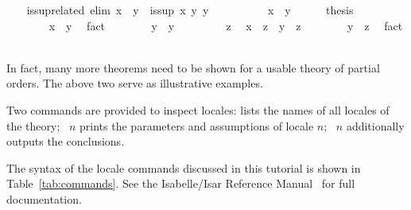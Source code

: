 \begin{isabellebody}
%
\endisatagproof
{\isafoldproof}%
%
\isadelimproof
\isanewline
%
\endisadelimproof
%
\isadeliminvisible
\isanewline
\ \ %
\endisadeliminvisible
%
\isataginvisible
{}\isamarkupfalse%
\ is{\isacharunderscore}sup{\isacharunderscore}related\ {\isacharbrackleft}elim{\isacharquery}{\isacharbrackright}{\isacharcolon}\ {\isachardoublequoteopen}x\ {\isasymsqsubseteq}\ y\ {\isasymLongrightarrow}\ is{\isacharunderscore}sup\ x\ y\ y{\isachardoublequoteclose}\isanewline
\ \ \isamarkupfalse%
\ {\isacharminus}\isanewline
\ \ \ \ \isamarkupfalse%
\ {\isachardoublequoteopen}x\ {\isasymsqsubseteq}\ y{\isachardoublequoteclose}\isanewline
\ \ \ \ \isamarkupfalse%
\ {\isacharquery}thesis\isanewline
\ \ \ \ \isamarkupfalse%
\isanewline
\ \ \ \ \ \ \isamarkupfalse%
\ {\isachardoublequoteopen}x\ {\isasymsqsubseteq}\ y{\isachardoublequoteclose}\ \isamarkupfalse%
\ fact\isanewline
\ \ \ \ \ \ \isamarkupfalse%
\ {\isachardoublequoteopen}y\ {\isasymsqsubseteq}\ y{\isachardoublequoteclose}\ \isacommand{{\isachardot}{\isachardot}}\isamarkupfalse%
\isanewline
\ \ \ \ \ \ \isamarkupfalse%
\ z\ \isamarkupfalse%
\ {\isachardoublequoteopen}x\ {\isasymsqsubseteq}\ z{\isachardoublequoteclose}\ \ {\isachardoublequoteopen}y\ {\isasymsqsubseteq}\ z{\isachardoublequoteclose}\isanewline
\ \ \ \ \ \ \isamarkupfalse%
\ {\isachardoublequoteopen}y\ {\isasymsqsubseteq}\ z{\isachardoublequoteclose}\ \isamarkupfalse%
\ fact\isanewline
\ \ \ \ \isamarkupfalse%
\isanewline
\ \ \isamarkupfalse%
%
\endisataginvisible
{\isafoldinvisible}%
%
\isadeliminvisible
\isanewline
%
\endisadeliminvisible
\isanewline
\ \ \isamarkupfalse%
%
\begin{isamarkuptext}%
In fact, many more theorems need to be shown for a usable
  theory of partial orders.  The
  above two serve as illustrative examples.%
\end{isamarkuptext}%
\isamarkuptrue%
%
\begin{isamarkuptext}%
Two commands are provided to inspect locales:
   lists the names of all locales of the
  theory; ~$n$ prints the parameters and
  assumptions of locale $n$; ~$n$
  additionally outputs the conclusions.

  The syntax of the locale commands discussed in this tutorial is
  shown in Table~\ref{tab:commands}.  See the
  Isabelle/Isar Reference Manual~\cite{IsarRef}
  for full documentation.%
\end{isamarkuptext}%
\isamarkuptrue%
%
\isamarkuptrue%
%
\begin{isamarkuptext}%
\label{sec:import}


\end{isamarkuptext}
\end{isabellebody}
